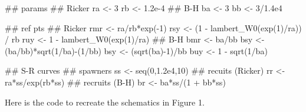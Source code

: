 \documentclass[11pt,]{article}
\newenvironment{Shaded}{}{}
\newcommand{\KeywordTok}[1]{\textcolor[rgb]{0.00,0.00,1.00}{#1}}
\newcommand{\DecValTok}[1]{#1}
\newcommand{\FloatTok}[1]{#1}
\newcommand{\StringTok}[1]{\textcolor[rgb]{0.00,0.50,0.50}{#1}}
\newcommand{\OperatorTok}[1]{#1}
\newcommand{\NormalTok}[1]{#1}
\begin{document}
\begin{Shaded}
\begin{Highlighting}[]
\NormalTok{## params}
\NormalTok{## Ricker}
\NormalTok{ra <-}\StringTok{ }\DecValTok{3}
\NormalTok{rb <-}\StringTok{ }\FloatTok{1.2e-4}
\NormalTok{## B-H}
\NormalTok{ba <-}\StringTok{ }\DecValTok{3}
\NormalTok{bb <-}\StringTok{ }\DecValTok{3}\OperatorTok{/}\FloatTok{1.4e4}

\NormalTok{## ref pts}
\NormalTok{## Ricker}
\NormalTok{rmr <-}\StringTok{ }\NormalTok{ra}\OperatorTok{/}\NormalTok{rb}\OperatorTok{*}\KeywordTok{exp}\NormalTok{(}\OperatorTok{-}\DecValTok{1}\NormalTok{)}
\NormalTok{rsy <-}\StringTok{ }\NormalTok{(}\DecValTok{1} \OperatorTok{-}\StringTok{ }\KeywordTok{lambert_W0}\NormalTok{(}\KeywordTok{exp}\NormalTok{(}\DecValTok{1}\NormalTok{)}\OperatorTok{/}\NormalTok{ra)) }\OperatorTok{/}\StringTok{ }\NormalTok{rb}
\NormalTok{ruy <-}\StringTok{ }\DecValTok{1} \OperatorTok{-}\StringTok{ }\KeywordTok{lambert_W0}\NormalTok{(}\KeywordTok{exp}\NormalTok{(}\DecValTok{1}\NormalTok{)}\OperatorTok{/}\NormalTok{ra)}
\NormalTok{## B-H}
\NormalTok{bmr <-}\StringTok{ }\NormalTok{ba}\OperatorTok{/}\NormalTok{bb}
\NormalTok{bsy <-}\StringTok{ }\NormalTok{(ba}\OperatorTok{/}\NormalTok{bb)}\OperatorTok{*}\KeywordTok{sqrt}\NormalTok{(}\DecValTok{1}\OperatorTok{/}\NormalTok{ba)}\OperatorTok{-}\NormalTok{(}\DecValTok{1}\OperatorTok{/}\NormalTok{bb)}
\NormalTok{bsy <-}\StringTok{ }\NormalTok{(}\KeywordTok{sqrt}\NormalTok{(ba)}\OperatorTok{-}\DecValTok{1}\NormalTok{)}\OperatorTok{/}\NormalTok{bb}
\NormalTok{buy <-}\StringTok{ }\DecValTok{1} \OperatorTok{-}\StringTok{ }\KeywordTok{sqrt}\NormalTok{(}\DecValTok{1}\OperatorTok{/}\NormalTok{ba)}

\NormalTok{## S-R curves}
\NormalTok{## spawners}
\NormalTok{ss <-}\StringTok{ }\KeywordTok{seq}\NormalTok{(}\DecValTok{0}\NormalTok{,}\FloatTok{1.2e4}\NormalTok{,}\DecValTok{10}\NormalTok{)}
\NormalTok{## recuits (Ricker)}
\NormalTok{rr <-}\StringTok{ }\NormalTok{ra}\OperatorTok{*}\NormalTok{ss}\OperatorTok{/}\KeywordTok{exp}\NormalTok{(rb}\OperatorTok{*}\NormalTok{ss)}
\NormalTok{## recruits (B-H)}
\NormalTok{br <-}\StringTok{ }\NormalTok{ba}\OperatorTok{*}\NormalTok{ss}\OperatorTok{/}\NormalTok{(}\DecValTok{1} \OperatorTok{+}\StringTok{ }\NormalTok{bb}\OperatorTok{*}\NormalTok{ss)}
\end{Highlighting}
\end{Shaded}

Here is the code to recreate the schematics in Figure 1.
\end{document}
